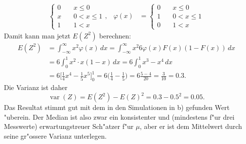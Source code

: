 \begin{loesung}
\begin{teilaufgaben}
\begin{align*}
\begin{cases}
0&\quad x \le 0\\
x&\quad 0<x\le1\\
1&\quad 1 < x
\end{cases},
&
\varphi(x)
&=\begin{cases}
0&\quad x \le 0\\
1&\quad 0<x\le1\\
0&\quad 1 < x
\end{cases}
\end{align*}
Damit kann man jetzt $E(Z^2)$ berechnen:
\begin{align*}
E(Z^2)&=\int_{-\infty}^{\infty}x^2 \varphi(x)\,dx=\int_{-\infty}^{\infty}
x^2
6\varphi(x)F(x)(1-F(x))
\,dx
\\
&=6\int_0^1x^2\cdot x(1-x)\,dx=6\int_0^1x^3-x^4\,dx\\
&=
6\biggl[
\frac14x^4-\frac15x^5
\biggr]_0^1=6\biggl(\frac14-\frac15\biggr)=6\frac{5-4}{20}=\frac3{10}=0.3.
\end{align*}
Die Varianz ist daher
\[
\operatorname{var}(Z)=E(Z^2)-E(Z)^2=0.3 - 0.5^2=0.05.
\]
Das Resultat stimmt gut mit dem in den Simulationen in b) gefunden Wert
"uberein. Der Median ist also zwar ein konsistenter und (mindestens f"ur
drei Messwerte) erwartungstreuer Sch"atzer f"ur $\mu$, aber er ist
dem Mittelwert durch seine gr"ossere Varianz unterlegen.
\qedhere
\end{teilaufgaben}
\end{loesung}

